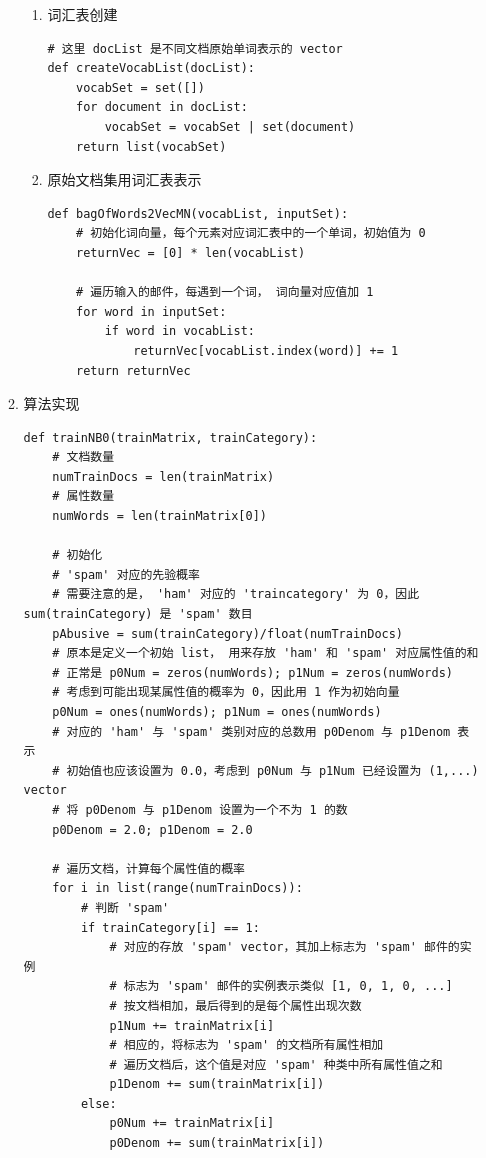 \documentclass[11pt]{ctexart}
\begin{document}
\begin{enumerate}
\begin{enumerate}
\begin{enumerate}
\item 词汇表创建
\lstset{language=Python,label= ,caption= ,captionpos=b,numbers=none}
\begin{lstlisting}
# 这里 docList 是不同文档原始单词表示的 vector
def createVocabList(docList):
    vocabSet = set([])
    for document in docList:
        vocabSet = vocabSet | set(document)
    return list(vocabSet)
\end{lstlisting}

\item 原始文档集用词汇表表示
\lstset{language=Python,label= ,caption= ,captionpos=b,numbers=none}
\begin{lstlisting}
def bagOfWords2VecMN(vocabList, inputSet):
    # 初始化词向量，每个元素对应词汇表中的一个单词，初始值为 0
    returnVec = [0] * len(vocabList)

    # 遍历输入的邮件，每遇到一个词， 词向量对应值加 1
    for word in inputSet:
        if word in vocabList:
            returnVec[vocabList.index(word)] += 1
    return returnVec
\end{lstlisting}
\end{enumerate}
\item 算法实现
\lstset{language=Python,label= ,caption= ,captionpos=b,numbers=none}
\begin{lstlisting}
def trainNB0(trainMatrix, trainCategory):
    # 文档数量
    numTrainDocs = len(trainMatrix)
    # 属性数量
    numWords = len(trainMatrix[0])

    # 初始化
    # 'spam' 对应的先验概率
    # 需要注意的是， 'ham' 对应的 'traincategory' 为 0，因此 sum(trainCategory) 是 'spam' 数目
    pAbusive = sum(trainCategory)/float(numTrainDocs)
    # 原本是定义一个初始 list， 用来存放 'ham' 和 'spam' 对应属性值的和
    # 正常是 p0Num = zeros(numWords); p1Num = zeros(numWords)
    # 考虑到可能出现某属性值的概率为 0，因此用 1 作为初始向量
    p0Num = ones(numWords); p1Num = ones(numWords)
    # 对应的 'ham' 与 'spam' 类别对应的总数用 p0Denom 与 p1Denom 表示
    # 初始值也应该设置为 0.0，考虑到 p0Num 与 p1Num 已经设置为 (1,...) vector
    # 将 p0Denom 与 p1Denom 设置为一个不为 1 的数
    p0Denom = 2.0; p1Denom = 2.0

    # 遍历文档，计算每个属性值的概率
    for i in list(range(numTrainDocs)):
        # 判断 'spam'
        if trainCategory[i] == 1:
            # 对应的存放 'spam' vector，其加上标志为 'spam' 邮件的实例
            # 标志为 'spam' 邮件的实例表示类似 [1, 0, 1, 0, ...]
            # 按文档相加，最后得到的是每个属性出现次数
            p1Num += trainMatrix[i]
            # 相应的，将标志为 'spam' 的文档所有属性相加
            # 遍历文档后，这个值是对应 'spam' 种类中所有属性值之和
            p1Denom += sum(trainMatrix[i])
        else:
            p0Num += trainMatrix[i]
            p0Denom += sum(trainMatrix[i])


\end{lstlisting}
\end{enumerate}
\end{enumerate}
\end{document}
